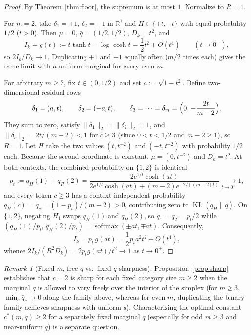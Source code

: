 \documentclass[11pt]{article}
\theoremstyle{plain}
\theoremstyle{definition}
\theoremstyle{remark}
\newtheorem{remark}{Remark}
\DeclareMathOperator{\KL}{KL}
\DeclareMathOperator{\softmax}{softmax}
\begin{document}
\begin{proof}
By Theorem~\ref{thm:floor}, the supremum is at most $1$. Normalize to $R = 1$.

For $m = 2$, take $\delta_1 = +1$, $\delta_2 = -1$ in $\mathbb{R}^1$ and $H \in \{+t, -t\}$ with equal probability $1/2$ ($t > 0$). Then $\mu = 0$, $\bar{q} = (1/2, 1/2)$, $D_k = t^2$, and
\[
I_k = g(t) := t\tanh t - \log\cosh t = \frac{1}{2}t^2 + O(t^4) \qquad (t \to 0^+),
\]
so $2 I_k / D_k \to 1$. Duplicating $+1$ and $-1$ equally often ($m/2$ times each) gives the same limit with a uniform marginal for every even $m$.

For arbitrary $m \ge 3$, fix $t \in (0, 1/2)$ and set $a := \sqrt{1 - t^2}$. Define two-dimensional residual rows
\[
\delta_1 = (a, t), \qquad \delta_2 = (-a, t), \qquad
\delta_3 = \cdots = \delta_m = \Bigl(0,\, -\frac{2t}{m - 2}\Bigr).
\]
They sum to zero, satisfy $\|\delta_1\|_2 = \|\delta_2\|_2 = 1$, and $\|\delta_c\|_2 = 2t/(m - 2) < 1$ for $c \ge 3$ (since $0 < t < 1/2$ and $m - 2 \ge 1$), so $R = 1$. Let $H$ take the two values $(t, t^{-2})$ and $(-t, t^{-2})$ with probability $1/2$ each. Because the second coordinate is constant, $\mu = (0, t^{-2})$ and $D_k = t^2$. At both contexts, the combined probability on $\{1, 2\}$ is identical:
\[
p_t := q_H(1) + q_H(2)
= \frac{2e^{1/t}\cosh(at)}{2e^{1/t}\cosh(at) + (m - 2)e^{-2/((m-2)t)}}
\xrightarrow[t \to 0^+]{} 1,
\]
and every token $c \ge 3$ has a context-independent probability $q_H(c) = \bar{q}_c = (1 - p_t)/(m - 2) > 0$, contributing zero to $\KL(q_H \| \bar{q})$. On $\{1, 2\}$, negating $H_1$ swaps $q_H(1)$ and $q_H(2)$, so $\bar{q}_1 = \bar{q}_2 = p_t / 2$ while $(q_H(1)/p_t,\, q_H(2)/p_t) = \softmax(\pm at, \mp at)$. Consequently,
\[
I_k = p_t\,g(at) = \frac{1}{2} p_t a^2 t^2 + O(t^4),
\]
whence $2 I_k / (R^2 D_k) = 2 p_t g(at)/t^2 \to 1$ as $t \to 0^+$.
\end{proof}

\begin{remark}[Fixed-$m$, free-$\bar{q}$ vs.\ fixed-$\bar{q}$ sharpness]
Proposition~\ref{prop:sharp} establishes that $c = 2$ is sharp for each fixed category size $m \ge 2$ when the marginal $\bar{q}$ is allowed to vary freely over the interior of the simplex (for $m \ge 3$, $\min_c \bar{q}_c \to 0$ along the family above, whereas for even $m$, duplicating the binary family achieves sharpness with uniform $\bar{q}$). Characterizing the optimal constant $c^*(m, \bar{q}) \ge 2$ for a separately fixed marginal $\bar{q}$ (especially for odd $m \ge 3$ and near-uniform $\bar{q}$) is a separate question.
\end{remark}
\end{document}

